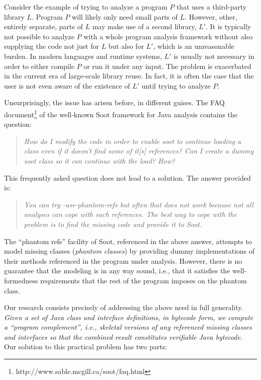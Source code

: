 Consider the example of trying to analyze a program $P$ that uses a
third-party library $L$. Program $P$ will likely only need small parts
of $L$.  However, other, entirely separate, parts of $L$ may make use
of a second library, $L'$.  It is typically not possible to analyze
$P$ with a whole program analysis framework without also supplying the
code not just for $L$ but also for $L'$, which is an unreasonable
burden. In modern languages and runtime systems, $L'$ is usually not
necessary in order to either compile $P$ or run it under any
input. The problem is exacerbated in the current era of large-scale
library reuse.  In fact, it is often the case that the user is not
even aware of the existence of $L'$ until trying to analyze $P$.

Unsurprisingly, the issue has arisen before, in different guises.  The
FAQ document\footnote{http://www.sable.mcgill.ca/soot/faq.html} of the
well-known Soot framework for Java
analysis \cite{vall99soot,valleerai00optimizing} contains the
question:

\vspace{-1mm}
\begin{quote}
  \emph{How do I modify the code in order to enable soot to continue
    loading a class even if it doesn't find some of it[s] references?
    Can I create a dummy soot class so it can continue with the load?
    How?}
\end{quote}

\noindent This frequently asked question does not lead to a
solution. The answer provided is:
\begin{quote}
  \emph{You can try -use-phantom-refs but often that does not work
    because not all analyses can cope with such references. The best
    way to cope with the problem is to find the missing code and
    provide it to Soot.}
\end{quote}

The ``phantom refs'' facility of Soot, referenced in the above answer,
attempts to model missing classes (\emph{phantom classes}) by
providing dummy implementations of their methods referenced in the
program under analysis. However, there is no guarantee that the
modeling is in any way sound, i.e., that it satisfies the well-formedness
requirements that the rest of the program imposes on the phantom
class.

Our research consists precisely of addressing the above need in full
generality. \emph{Given a set of Java class and interface definitions,
  in bytecode form, we compute a ``program complement'', i.e.,
  skeletal versions of any referenced missing classes and interfaces
  so that the combined result constitutes verifiable Java bytecode.}
Our solution to this practical problem has two parts:

